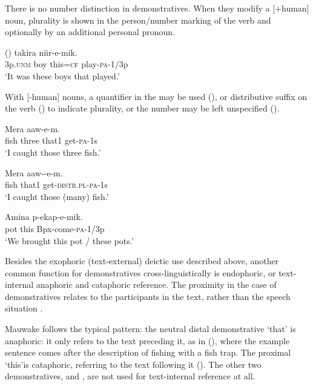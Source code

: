 There is no number distinction in demonstratives. When they modify a [+human] noun, plurality is shown in the person/number marking of the verb and optionally by an additional personal pronoun.

\ea%
\label{ex:x635}
\gll () takira  niir-e-mik. \\
3p.\textsc{unm} boy this=\textsc{cf} play-\textsc{pa}-1/3p\\
\glt`It was these boys that played.'
\z

With [-human] nouns, a quantifier in the  may be used (), or distributive suffix on the verb () to indicate plurality, or the number may be left unspecified ().

\ea%
\label{ex:x636}
\gll Mera   aaw-e-m. \\
fish three that1 get-\textsc{pa}-1s\\
\glt`I caught those three fish.'
\z

\ea%
\label{ex:x637}
\gll Mera  aaw--e-m. \\
fish that1 get-\textsc{distr}.\textsc{pl}-\textsc{pa}-1s\\
\glt`I caught those (many) fish.'
\z

\ea%
\label{ex:x638}
\gll Amina  p-ekap-e-mik. \\
pot this Bpx-come-\textsc{pa}-1/3p\\
\glt`We brought this pot / these pots.'
\z

Besides the exophoric (text-external) deictic use described above, another common function for demonstratives cross-linguistically is endophoric, or text-internal anaphoric and cataphoric reference. The proximity in the case of demonstratives relates to the participants in the text, rather than the speech situation \citep[278]{Lyons1968}. 

Mauwake follows the typical pattern: the neutral distal demonstrative  `that' is anaphoric: it only refers to the text preceding it, as in (), where the example sentence comes after the description of fishing with a fish trap. The proximal  `this'is cataphoric, referring to the text following it (). The other two demonstratives,  and , are not used for text-internal reference at all.

